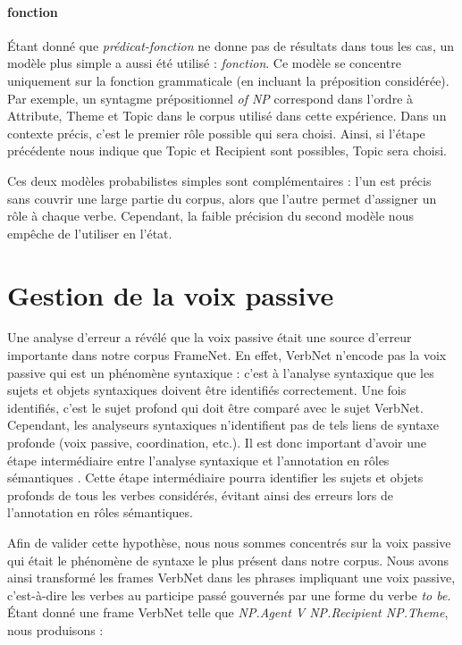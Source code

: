 \paragraph{fonction}

Étant donné que \emph{prédicat-fonction} ne donne pas de résultats dans tous les
cas, un modèle plus simple a aussi été utilisé : \emph{fonction}. Ce modèle se
concentre uniquement sur la fonction grammaticale (en incluant la préposition
considérée). Par exemple, un syntagme prépositionnel \emph{of NP} correspond
dans l'ordre à Attribute, Theme et Topic dans le corpus utilisé dans cette
expérience. Dans un contexte précis, c'est le premier rôle possible qui sera
choisi. Ainsi, si l'étape précédente nous indique que Topic et Recipient sont
possibles, Topic sera choisi.

Ces deux modèles probabilistes simples sont complémentaires : l'un est précis
sans couvrir une large partie du corpus, alors que l'autre permet d'assigner un
rôle à chaque verbe. Cependant, la faible précision du second modèle nous
empêche de l'utiliser en l'état. %

\section{Gestion de la voix passive}
\label{sec:passif}

Une analyse d'erreur a révélé que la voix passive était une source d'erreur
importante dans notre corpus FrameNet. En effet, VerbNet n'encode pas la voix
passive qui est un phénomène syntaxique : c'est à l'analyse syntaxique que les
sujets et objets syntaxiques doivent être identifiés correctement. Une fois
identifiés, c'est le sujet profond qui doit être comparé avec le sujet VerbNet.
Cependant, les analyseurs syntaxiques n'identifient pas de tels liens de
syntaxe profonde (voix passive, coordination, etc.). Il est donc important
d'avoir une étape intermédiaire entre l'analyse syntaxique et l'annotation en
rôles sémantiques \citep{bonfante2011modular, ribeyre2013systeme}. Cette étape
intermédiaire pourra identifier les sujets et objets profonds de tous les
verbes considérés, évitant ainsi des erreurs lors de l'annotation en rôles
sémantiques. 

Afin de valider cette hypothèse, nous nous sommes concentrés sur la voix
passive qui était le phénomène de syntaxe le plus présent dans notre corpus.
Nous avons ainsi transformé les frames VerbNet dans les phrases impliquant une
voix passive, c'est-à-dire les verbes au participe passé gouvernés par une
forme du verbe \emph{to be}. Étant donné une frame VerbNet telle que
\emph{NP.Agent V NP.Recipient NP.Theme}, nous produisons :

